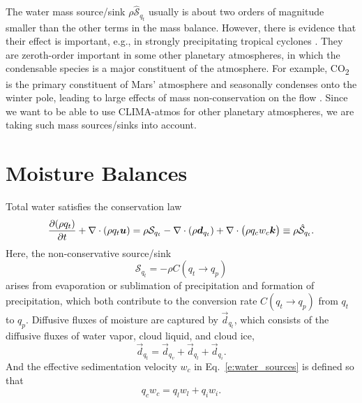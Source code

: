 \documentclass{report}
\begin{document}
The water mass source/sink $\rho \mathcal{\hat S}_{q_t}$ usually is about two orders of magnitude smaller than the other terms in the mass balance. However, there is evidence that their effect is important, e.g., in strongly precipitating tropical cyclones \citep{Qiu93a,Lackmann04a}. They are zeroth-order important in some other planetary atmospheres, in which the condensable species is a major constituent of the atmosphere. For example, CO\textsubscript{2} is the primary constituent of Mars' atmosphere and seasonally condenses onto the winter pole, leading to large effects of mass non-conservation on the flow \cite[e.g.,][]{Soto15a}. Since we want to be able to use CLIMA-atmos for other planetary atmospheres, we are taking such mass sources/sinks into account.

\section{Moisture Balances}\label{s:moisture_balance}

Total water satisfies the conservation law
\begin{equation}
\frac{\partial (\rho q_t)}{\partial t} + \nabla \cdot (\rho q_t \boldsymbol{{u}})
= \rho \mathcal{S}_{q_t} - \nabla \cdot (\rho \boldsymbol{{d}}_{q_t}) + \nabla \cdot \bigl(\rho q_c w_c \boldsymbol{{k}}  \bigr)
\equiv \rho \mathcal{\hat S}_{q_t}.   
\label{eq:governing_equations/moisture}
\end{equation}
Here, the non-conservative source/sink
\begin{equation}\label{e:water_sources}
     \mathcal{S}_{q_t} = - \rho C(q_t \rightarrow q_p)
\end{equation}
arises from evaporation or sublimation of precipitation and formation of precipitation, which both contribute to the conversion rate $C(q_t \rightarrow q_p)$ from $q_t$ to $q_p$. Diffusive fluxes of moisture are captured by $\vec{d}_{q_t}$, which consists of the diffusive fluxes of water vapor, cloud liquid, and cloud ice, 
\begin{equation}
    \vec{d}_{q_t} =\vec{d}_{q_v} + \vec{d}_{q_l} + \vec{d}_{q_i}.
\end{equation}
And the effective sedimentation velocity $w_c$ in Eq.~\eqref{e:water_sources} is defined so that 
\begin{equation}
    q_c w_c = q_l w_l + q_i w_i.
\end{equation}
\end{document}

